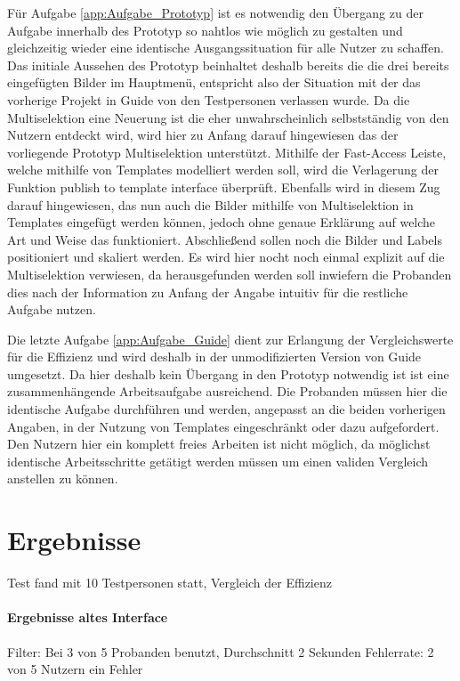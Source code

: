 Für Aufgabe \ref{app:Aufgabe_Prototyp} ist es notwendig den Übergang zu der Aufgabe innerhalb des Prototyp so nahtlos wie möglich zu gestalten und gleichzeitig wieder eine identische Ausgangssituation für alle Nutzer zu schaffen.
Das initiale Aussehen des Prototyp beinhaltet deshalb bereits die die drei bereits eingefügten Bilder im Hauptmenü, entspricht also der Situation mit der das vorherige Projekt in Guide von den Testpersonen verlassen wurde.
Da die Multiselektion eine Neuerung ist die eher unwahrscheinlich selbstständig von den Nutzern entdeckt wird, wird hier zu Anfang darauf hingewiesen das der vorliegende Prototyp Multiselektion unterstützt.
Mithilfe der Fast-Access Leiste, welche mithilfe von Templates modelliert werden soll, wird die Verlagerung der Funktion \glqq publish to template interface\grqq{} überprüft.
Ebenfalls wird in diesem Zug darauf hingewiesen, das nun auch die Bilder mithilfe von Multiselektion in Templates eingefügt werden können, jedoch ohne genaue Erklärung auf welche Art und Weise das funktioniert.
Abschließend sollen noch die Bilder und Labels positioniert und skaliert werden.
Es wird hier nocht noch einmal explizit auf die Multiselektion verwiesen, da herausgefunden werden soll inwiefern die Probanden dies nach der Information zu Anfang der Angabe intuitiv für die restliche Aufgabe nutzen.

Die letzte Aufgabe \ref{app:Aufgabe_Guide} dient zur Erlangung der Vergleichswerte für die Effizienz und wird deshalb in der unmodifizierten Version von Guide umgesetzt.
Da hier deshalb kein Übergang in den Prototyp notwendig ist ist eine zusammenhängende Arbeitsaufgabe ausreichend.
Die Probanden müssen hier die identische Aufgabe durchführen und werden, angepasst an die beiden vorherigen Angaben, in der Nutzung von Templates eingeschränkt oder dazu aufgefordert.
Den Nutzern hier ein komplett freies Arbeiten ist nicht möglich, da möglichst identische Arbeitsschritte getätigt werden müssen um einen validen Vergleich anstellen zu können.


\section {Ergebnisse}
Test fand mit 10 Testpersonen statt, Vergleich der Effizienz \cite{.h}

\paragraph{Ergebnisse altes Interface}
Filter: Bei 3 von 5 Probanden benutzt, Durchschnitt 2 Sekunden
Fehlerrate: 2 von 5 Nutzern ein Fehler

